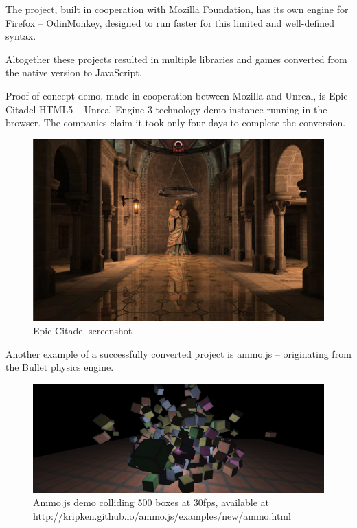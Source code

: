 

The project, built in cooperation with Mozilla Foundation, has its own engine for Firefox -- OdinMonkey, designed to run faster for this limited and well-defined syntax.

Altogether these projects resulted in multiple libraries and games converted from the native version to JavaScript.

Proof-of-concept demo, made in cooperation between Mozilla and Unreal, is Epic Citadel HTML5 -- Unreal Engine 3 technology demo\cite{epiccitadel}  instance running in the browser.\cite{epiccitadelhtml5} The companies claim it took only four days to complete the conversion.

\begin{figure}[h!]
  \caption{Epic Citadel screenshot}
  \label{img:epicitadel}
  \centering
	\includegraphics[width=16cm]{emscripten/epic-citadel.jpg}
\end{figure}

Another example of a successfully converted project is ammo.js\cite{ammojs} -- originating from the Bullet physics engine.

\begin{figure}[h!]
  \caption{Ammo.js demo colliding 500 boxes at 30fps, available at http://kripken.github.io/ammo.js/examples/new/ammo.html}
  \label{img:epicitadel}
  \centering
	\includegraphics[width=16cm]{emscripten/ammojs.png}
\end{figure}

